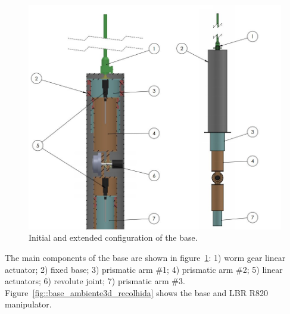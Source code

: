 \begin{figure}[h!]
\centering
	\includegraphics[width=\columnwidth]{figs/estudo/solid/baselbr.jpg} 
	\caption{Initial and extended configuration of the base.}
	\label{fig::baselbr}
\end{figure}



The main components of the base are shown in figure~\ref{fig::baselbr}: 1) worm
gear linear actuator; 2) fixed base; 3) prismatic arm \#1; 4) prismatic arm \#2;
5) linear actuators; 6) revolute joint; 7) prismatic arm \#3.
Figure~\ref{fig::base_ambiente3d_recolhida} shows the base and LBR R820 manipulator.


